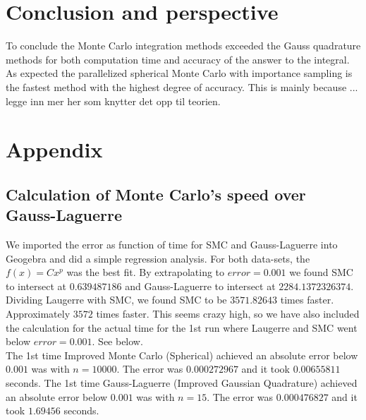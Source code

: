 \documentclass{article}
\begin{document}
\vspace{1cm}

\section{Conclusion and perspective} \label{sec:Conclusion}

To conclude the Monte Carlo integration methods exceeded the Gauss quadrature methods for both computation time and accuracy of the answer to the integral. As expected the parallelized spherical Monte Carlo with importance sampling is the fastest method with the highest degree of accuracy. This is mainly because ... \\

legge inn mer her som knytter det opp til teorien.


\vspace{1cm}

\section{Appendix} \label{sec:Appendix}

\subsection{Calculation of Monte Carlo's speed over Gauss-Laguerre}
We imported the error as function of time for SMC and Gauss-Laguerre into Geogebra and did a simple regression analysis. For both data-sets, the $f(x)=Cx^p$ was the best fit. By extrapolating to $error=0.001$ we found SMC to intersect at $0.639487186$ and Gauss-Laguerre to intersect at $2284.1372326374$. Dividing Laugerre with SMC, we found SMC to be $3571.82643$ times faster. Approximately $3572$ times faster. This seems crazy high, so we have also included the calculation for the actual time for the 1st run where Laugerre and SMC went below $error=0.001$. See below.\\

The 1st time Improved Monte Carlo (Spherical) achieved an absolute error below $0.001$ was with $n=10000$. The error was $0.000272967$ and it took $0.00655811$ seconds. The 1st time Gauss-Laguerre (Improved Gaussian Quadrature) achieved an absolute error below $0.001$ was with $n=15$. The error was $0.000476827$ and it took $1.69456$ seconds. \\
\end{document}
